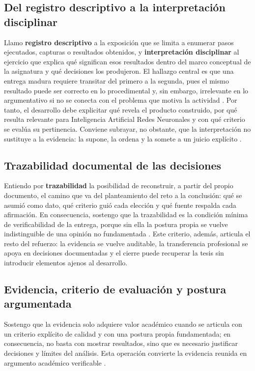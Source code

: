 \documentclass[spanish,letterpaper,oneside]{article}
\def\coursename {Inteligencia Artificial Redes Neuronales}
\begin{document}
\subsection*{Del registro descriptivo a la \textbf{interpretación disciplinar}}
Llamo \textbf{registro descriptivo} a la exposición que se limita a enumerar pasos ejecutados, capturas o resultados obtenidos, y \textbf{interpretación disciplinar} al ejercicio que explica qué significan esos resultados dentro del marco conceptual de la asignatura y qué decisiones los produjeron. El hallazgo central es que una entrega madura requiere transitar del primero a la segunda, pues el mismo resultado puede ser correcto en lo procedimental y, sin embargo, irrelevante en lo argumentativo si no se conecta con el problema que motiva la actividad \citep{programa-inteligencia-artificial-redes-neuronales-imtc,cicloARefuerzo02}. Por tanto, el desarrollo debe explicitar qué revela el producto construido, por qué resulta relevante para \coursename{} y con qué criterio se evalúa su pertinencia. Conviene subrayar, no obstante, que la interpretación no sustituye a la evidencia: la supone, la ordena y la somete a un juicio explícito \citep{cicloARefuerzo03}.

\subsection*{\textbf{Trazabilidad} documental de las decisiones}
Entiendo por \textbf{trazabilidad} la posibilidad de reconstruir, a partir del propio documento, el camino que va del planteamiento del reto a la conclusión: qué se asumió como dato, qué criterio guió cada elección y qué fuente respalda cada afirmación. En consecuencia, sostengo que la trazabilidad es la condición mínima de verificabilidad de la entrega, porque sin ella la postura propia se vuelve indistinguible de una opinión no fundamentada \citep{cicloARefuerzo04,cicloARefuerzo06}. Este criterio, además, articula el resto del refuerzo: la evidencia se vuelve auditable, la transferencia profesional se apoya en decisiones documentadas y el cierre puede recuperar la tesis sin introducir elementos ajenos al desarrollo.

\subsection*{\textbf{Evidencia}, criterio de evaluación y postura argumentada}
Sostengo que la evidencia solo adquiere valor académico cuando se articula con un criterio explícito de calidad y con una postura propia fundamentada; en consecuencia, no basta con mostrar resultados, sino que es necesario justificar decisiones y límites del análisis. Esta operación convierte la evidencia reunida en argumento académico verificable \citep{cicloARefuerzo03,cicloARefuerzo05}.
\end{document}
